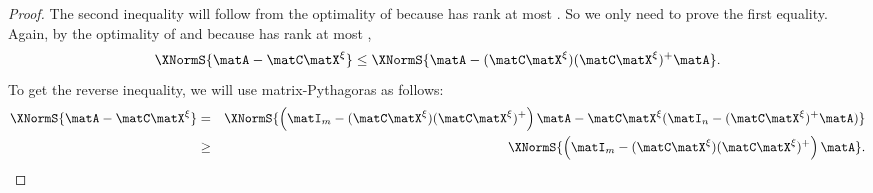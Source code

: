 \begin{proof}
The second inequality will follow from the optimality of
\math{\matX^\xi} because
\math{\matY(\matC\matY)^+\matA} has rank at most . So we only need to
prove the first equality. Again, by the optimality of
\math{\matX^\xi} and  because
\math{\matX^\xi(\matC\matX^\xi)^+\matA} has rank at most ,
$$\XNormS{\matA-\matC\matX^\xi} \le \XNormS{\matA-(\matC\matX^\xi)
(\matC\matX^\xi)^+\matA}.$$ To get the reverse inequality, we will use
matrix-Pythagoras as follows:
\begin{eqnarray*}
\XNormS{\matA - \matC\matX^\xi}
&=&
\XNormS{\left(\matI_m-(\matC\matX^\xi)(\matC\matX^\xi)^+\right)\matA-
\matC\matX^\xi(\matI_n-(\matC\matX^\xi)^+\matA)}\\
&\ge&
\XNormS{\left(\matI_m-(\matC\matX^\xi)(\matC\matX^\xi)^+\right)\matA}.
\end{eqnarray*}
\end{proof}


